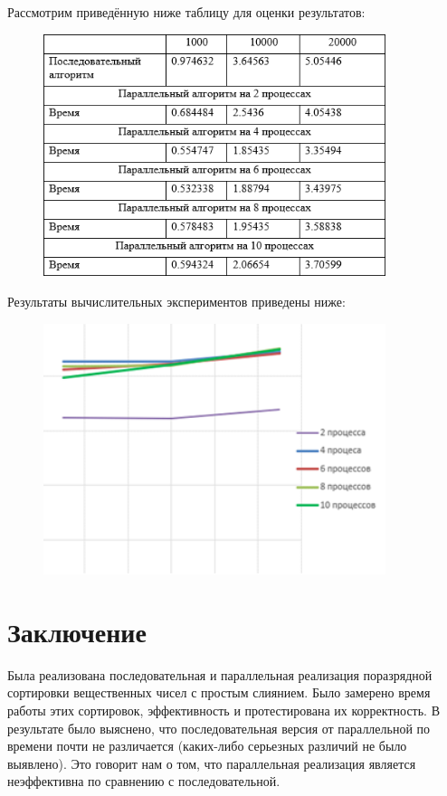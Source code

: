 \documentclass{report}
\begin{document}
\par Рассмотрим приведённую ниже таблицу для оценки результатов:
\\


\begin{figure}[htp]
    \centering
    \includegraphics[width=10cm]{images/tt.png}
    \label{fig:galaxy}
\end{figure}


\par Результаты вычислительных экспериментов приведены ниже:

\begin{figure}[htp]
    \centering
    \includegraphics[width=10cm]{images/image11.png}
    \label{fig:galaxy}
\end{figure}

\newpage

\section*{Заключение}
\par Была реализована последовательная и параллельная реализация поразрядной сортировки вещественных чисел с простым слиянием. Было замерено время работы этих сортировок, эффективность и протестирована их корректность. В результате было выяснено, что последовательная версия от параллельной по времени почти не различается (каких-либо серьезных различий не было выявлено). Это говорит нам о том, что параллельная реализация является неэффективна по сравнению с последовательной.
\end{document}
